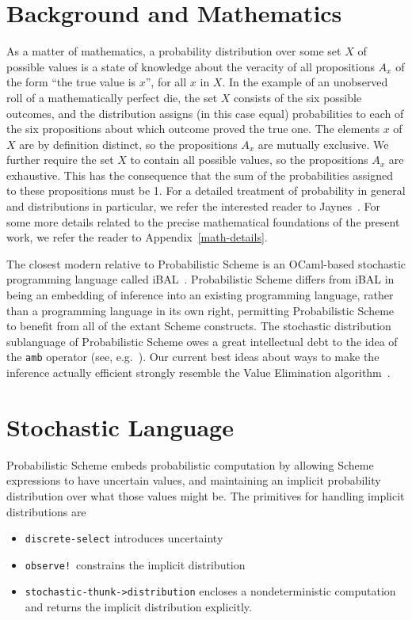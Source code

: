\documentclass[12pt]{article}
\newcommand{\code}[1]{\texttt{#1}}
\begin{document}
\section{Background and Mathematics}
\label{mathematics}

As a matter of mathematics, a probability distribution over some set
$X$ of possible values is a state of knowledge about the veracity of
all propositions $A_x$ of the form ``the true value is $x$'', for all
$x$ in $X$.  In the example of an unobserved roll of a mathematically
perfect die, the set $X$ consists of the six possible outcomes, and
the distribution assigns (in this case equal) probabilities to each of
the six propositions about which outcome proved the true one.  The
elements $x$ of $X$ are by definition distinct, so the propositions
$A_x$ are mutually exclusive.  We further require the set $X$ to
contain all possible values, so the propositions $A_x$ are exhaustive.
This has the consequence that the sum of the probabilities assigned to
these propositions must be 1.  For a detailed treatment of probability
in general and distributions in particular, we refer the interested
reader to Jaynes~\cite{jaynes}.  For some more details related to
the precise mathematical foundations of the present work, we refer
the reader to Appendix~\ref{math-details}.

The closest modern relative to Probabilistic Scheme is an OCaml-based
stochastic programming language called iBAL~\cite{pfeffer01ibal}.
Probabilistic Scheme differs from iBAL in being an embedding of
inference into an existing programming language, rather than a
programming language in its own right, permitting Probabilistic Scheme
to benefit from all of the extant Scheme constructs.
The stochastic distribution sublanguage of Probabilistic Scheme owes
a great intellectual debt to the idea of the \code{amb} operator
(see, e.g.~\cite{sicp}).  Our current best ideas about
ways to make the inference actually efficient strongly resemble
the Value Elimination algorithm~\cite{bacchus03value}.

\section{Stochastic Language}
\label{implicit}

Probabilistic Scheme embeds probabilistic computation by allowing 
Scheme expressions to have uncertain values, and maintaining an 
implicit probability distribution over what those values might be.
The primitives for handling implicit distributions are
\begin{itemize} 
\item \code{discrete-select} introduces uncertainty
\item \code{observe!}\ constrains the implicit distribution
\item \code{stochastic-thunk->distribution} encloses a nondeterministic
computation and returns the implicit distribution explicitly.
\end{itemize}
\end{document}

